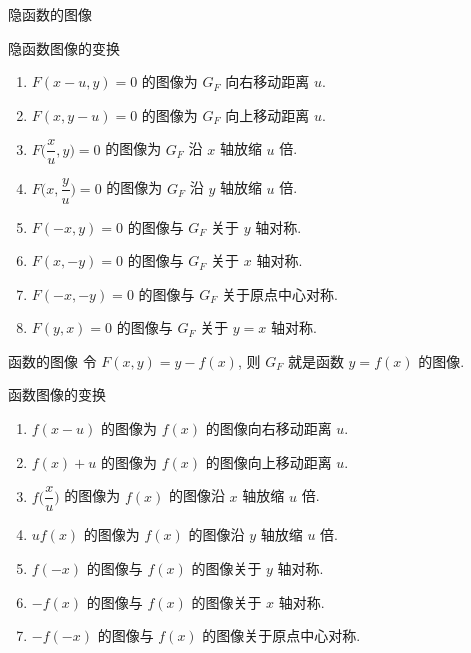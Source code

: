 \begin{frame}{隐函数的图像\noexer}
	\onslide<+->
	\begin{main}{隐函数图像的变换}
		\begin{enumerate}
			\item $F(x-u,y)=0$ 的图像为 $G_F$ 向右移动距离 $u$.
			\item $F(x,y-u)=0$ 的图像为 $G_F$ 向上移动距离 $u$.
			\item $F\bigl(\dfrac xu,y\bigr)=0$ 的图像为 $G_F$ 沿 $x$ 轴放缩 $u$ 倍.
			\item $F\bigl(x,\dfrac yu\bigr)=0$ 的图像为 $G_F$ 沿 $y$ 轴放缩 $u$ 倍.
			\item $F(-x,y)=0$ 的图像与 $G_F$ 关于 $y$ 轴对称.
			\item $F(x,-y)=0$ 的图像与 $G_F$ 关于 $x$ 轴对称.
			\item $F(-x,-y)=0$ 的图像与 $G_F$ 关于原点中心对称.
			\item $F(y,x)=0$ 的图像与 $G_F$ 关于 $y=x$ 轴对称.
		\end{enumerate}
	\end{main}
\end{frame}


\begin{frame}{函数的图像\noexer}
	\onslide<+->
	令 $F(x,y)=y-f(x)$, 则 $G_F$ 就是函数 $y=f(x)$ 的图像.
	\onslide<+->
	\begin{main}{函数图像的变换}
		\begin{enumerate}
			\item $f(x-u)$ 的图像为 $f(x)$ 的图像向右移动距离 $u$.
			\item $f(x)+u$ 的图像为 $f(x)$ 的图像向上移动距离 $u$.
			\item $f\bigl(\dfrac xu\bigr)$ 的图像为 $f(x)$ 的图像沿 $x$ 轴放缩 $u$ 倍.
			\item $uf(x)$ 的图像为 $f(x)$ 的图像沿 $y$ 轴放缩 $u$ 倍.
			\item $f(-x)$ 的图像与 $f(x)$ 的图像关于 $y$ 轴对称.
			\item $-f(x)$ 的图像与 $f(x)$ 的图像关于 $x$ 轴对称.
			\item $-f(-x)$ 的图像与 $f(x)$ 的图像关于原点中心对称.
		\end{enumerate}
	\end{main}
\end{frame}


